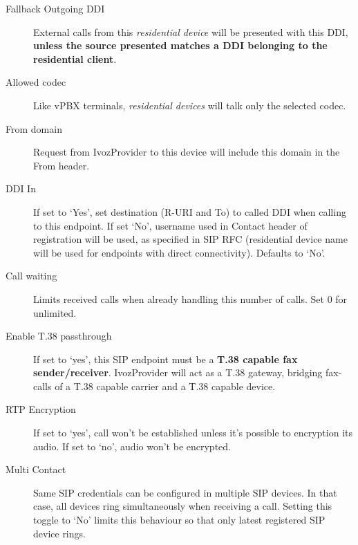 \documentclass[letterpaper,10pt,english]{sphinxmanual}
\begin{document}
\begin{description}
\item[{Fallback Outgoing DDI}] \leavevmode{}\label{administration_portal/client/residential/residential_devices:term-fallback-outgoing-ddi}
External calls from this \emph{residential device} will be presented with this DDI, \textbf{unless
the source presented matches a DDI belonging to the residential client}.

\item[{Allowed codec}] \leavevmode{}\label{administration_portal/client/residential/residential_devices:term-allowed-codec}
Like vPBX terminals, \emph{residential devices} will talk only the selected codec.

\item[{From domain}] \leavevmode{}\label{administration_portal/client/residential/residential_devices:term-from-domain}
Request from IvozProvider to this device will include this domain in
the From header.

\item[{DDI In}] \leavevmode{}\label{administration_portal/client/residential/residential_devices:term-ddi-in}
If set to `Yes', set destination (R-URI and To) to called DDI when calling to this endpoint. If set `No', username
used in Contact header of registration will be used, as specified in SIP RFC (residential device name will be used
for endpoints with direct connectivity). Defaults to `No'.

\item[{Call waiting}] \leavevmode{}\label{administration_portal/client/residential/residential_devices:term-call-waiting}
Limits received calls when already handling this number of calls. Set 0 for unlimited.

\item[{Enable T.38 passthrough}] \leavevmode{}\label{administration_portal/client/residential/residential_devices:term-enable-t-38-passthrough}
If set to `yes', this SIP endpoint must be a \textbf{T.38 capable fax sender/receiver}. IvozProvider
will act as a T.38 gateway, bridging fax-calls of a T.38 capable carrier and a T.38 capable device.

\item[{RTP Encryption}] \leavevmode{}\label{administration_portal/client/residential/residential_devices:term-rtp-encryption}
If set to `yes', call won't be established unless it's possible to encryption its audio. If set to `no',
audio won't be encrypted.

\item[{Multi Contact}] \leavevmode{}\label{administration_portal/client/residential/residential_devices:term-multi-contact}
Same SIP credentials can be configured in multiple SIP devices. In that case, all devices ring
simultaneously when receiving a call. Setting this toggle to `No' limits this behaviour so that
only latest registered SIP device rings.

\end{description}
\end{document}
